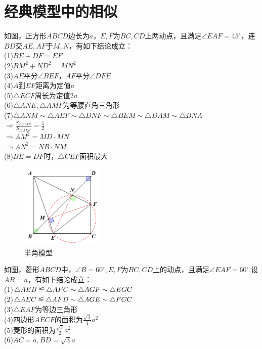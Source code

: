 \documentclass{ecnuthesis}
\newcommand\backcong{\mathrel{\reflectbox{$\cong$}}}
\begin{document}
\section{经典模型中的相似}
\begin{model}
    如图，正方形$ABCD$边长为$a$，$E,F$为$BC,CD$上两动点，且满足$\angle EAF=45^\circ$，连$BD$交$AE,AF$于$M,N$，有如下结论成立：\\
    (1)$BE+DF=EF$ \\
    (2)$BM^2+ND^2=MN^2$ \\
    (3)$AE$平分$\angle BEF$，$AF$平分$\angle DFE$ \\
    (4)$A$到$EF$距离为定值$a$ \\
    (5)$\triangle ECF$周长为定值$2a$ \\
    (6)$\triangle ANE,\triangle AMF$为等腰直角三角形 \\
    (7)$\triangle ANM \sim \triangle AEF \sim \triangle DNF \sim \triangle BEM \sim \triangle DAM \sim \triangle BNA$ \\
    $\Rightarrow \frac{S_{\triangle AMN}}{S_{\triangle AEF}}=\frac{1}{2}$ \\
    $\Rightarrow AM^2=MD·MN$ \\
    $\Rightarrow AN^2=NB·NM$ \\
    (8)$BE=DF$时，$\triangle CEF$面积最大
\end{model}
\begin{figure}[H]
\centering
\includegraphics[width=4cm]{picture/6104.png}
\caption{半角模型}
\end{figure}
\clearpage
\begin{model}
    如图，菱形$ABCD$中，$\angle B=60^\circ,E,F$为$BC,CD$上的动点，且满足$\angle EAF=60^\circ$.设$AB=a$，有如下结论成立：\\
    (1)$\triangle AEB \backcong \triangle AFC \sim \triangle AGF \sim \triangle EGC$ \\
    (2)$\triangle AEC \backcong \triangle AFD \sim \triangle AGE \sim \triangle FGC$ \\
    (3)$\triangle EAF$为等边三角形 \\
    (4)四边形$AECF$的面积为$\frac{\sqrt3}{4}a^2$ \\
    (5)菱形的面积为$\frac{\sqrt3}{2}a^2$ \\
    (6)$AC=a,BD=\sqrt3a$
\end{model}
\end{document}
